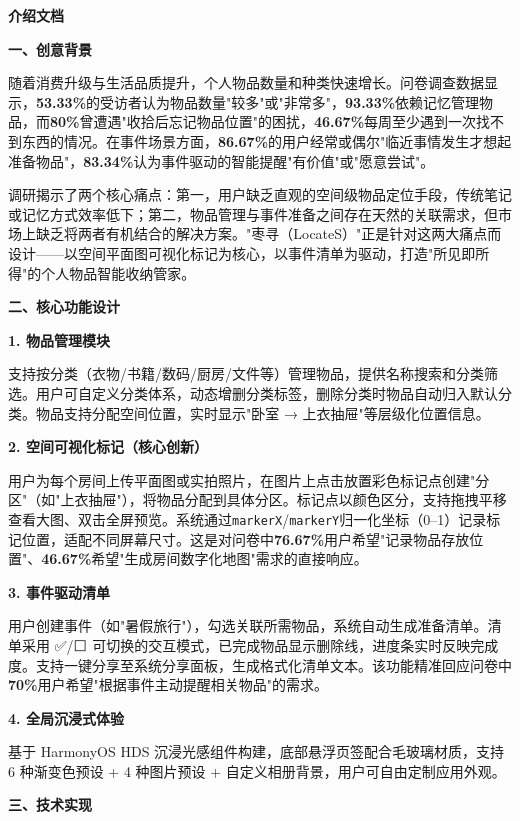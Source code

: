 \documentclass[UTF8,zihao=5,twoside]{ctexart}
\newcommand{\blankline}{\vspace{\baselineskip}\par}
\newcommand{\secondheading}[1]{{\noindent\zihao{4}\bfseries #1\par}}
\newcommand{\thirdheading}[1]{{\noindent\zihao{-4}\bfseries #1\par}}
\begin{document}
\blankline

\secondheading{介绍文档}

\blankline

\thirdheading{一、创意背景}

随着消费升级与生活品质提升，个人物品数量和种类快速增长。问卷调查数据显示，\textbf{53.33\%}的受访者认为物品数量"较多"或"非常多"，\textbf{93.33\%}依赖记忆管理物品，而\textbf{80\%}曾遭遇"收拾后忘记物品位置"的困扰，\textbf{46.67\%}每周至少遇到一次找不到东西的情况。在事件场景方面，\textbf{86.67\%}的用户经常或偶尔"临近事情发生才想起准备物品"，\textbf{83.34\%}认为事件驱动的智能提醒"有价值"或"愿意尝试"。

调研揭示了两个核心痛点：第一，用户缺乏直观的空间级物品定位手段，传统笔记或记忆方式效率低下；第二，物品管理与事件准备之间存在天然的关联需求，但市场上缺乏将两者有机结合的解决方案。"枣寻（LocateS）"正是针对这两大痛点而设计——以空间平面图可视化标记为核心，以事件清单为驱动，打造"所见即所得"的个人物品智能收纳管家。

\thirdheading{二、核心功能设计}

\textbf{1. 物品管理模块}

支持按分类（衣物/书籍/数码/厨房/文件等）管理物品，提供名称搜索和分类筛选。用户可自定义分类体系，动态增删分类标签，删除分类时物品自动归入默认分类。物品支持分配空间位置，实时显示"卧室 → 上衣抽屉"等层级化位置信息。

\textbf{2. 空间可视化标记（核心创新）}

用户为每个房间上传平面图或实拍照片，在图片上点击放置彩色标记点创建"分区"（如"上衣抽屉"），将物品分配到具体分区。标记点以颜色区分，支持拖拽平移查看大图、双击全屏预览。系统通过\verb|markerX|/\verb|markerY|归一化坐标（0--1）记录标记位置，适配不同屏幕尺寸。这是对问卷中\textbf{76.67\%}用户希望"记录物品存放位置"、\textbf{46.67\%}希望"生成房间数字化地图"需求的直接响应。

\textbf{3. 事件驱动清单}

用户创建事件（如"暑假旅行"），勾选关联所需物品，系统自动生成准备清单。清单采用 ✅/⬜ 可切换的交互模式，已完成物品显示删除线，进度条实时反映完成度。支持一键分享至系统分享面板，生成格式化清单文本。该功能精准回应问卷中\textbf{70\%}用户希望"根据事件主动提醒相关物品"的需求。

\textbf{4. 全局沉浸式体验}

基于 HarmonyOS HDS 沉浸光感组件构建，底部悬浮页签配合毛玻璃材质，支持 6 种渐变色预设 + 4 种图片预设 + 自定义相册背景，用户可自由定制应用外观。

\thirdheading{三、技术实现}
\end{document}
